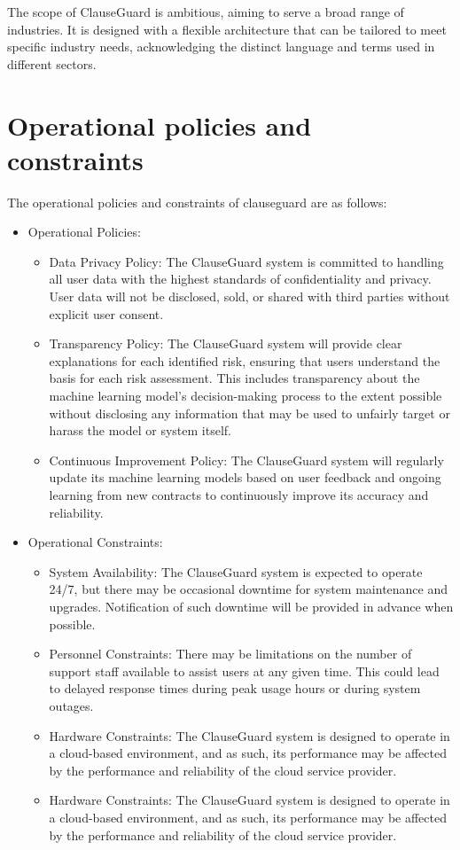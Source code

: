 The scope of ClauseGuard is ambitious, aiming to serve a broad range of industries. It is designed with a flexible architecture that can be tailored to meet specific industry needs, acknowledging the distinct language and terms used in different sectors.



\section{Operational policies and constraints \label{Section::Operational Policies and Constraints proposed}}
The operational policies and constraints of clauseguard are as follows: 
\begin{itemize}
    \item Operational Policies: 
    \begin{itemize}
        \item Data Privacy Policy: The ClauseGuard system is committed to handling all user data with the highest standards of confidentiality and privacy. User data will not be disclosed, sold, or shared with third parties without explicit user consent.

        \item Transparency Policy: The ClauseGuard system will provide clear explanations for each identified risk, ensuring that users understand the basis for each risk assessment. This includes transparency about the machine learning model's decision-making process to the extent possible without disclosing any information that may be used to unfairly target or harass the model or system itself. 
        \item Continuous Improvement Policy: The ClauseGuard system will regularly update its machine learning models based on user feedback and ongoing learning from new contracts to continuously improve its accuracy and reliability.
        
    \end{itemize}
    \item Operational Constraints: 
    \begin{itemize}
        \item System Availability: The ClauseGuard system is expected to operate 24/7, but there may be occasional downtime for system maintenance and upgrades. Notification of such downtime will be provided in advance when possible.
        \item Personnel Constraints: There may be limitations on the number of support staff available to assist users at any given time. This could lead to delayed response times during peak usage hours or during system outages.
        \item Hardware Constraints: The ClauseGuard system is designed to operate in a cloud-based environment, and as such, its performance may be affected by the performance and reliability of the cloud service provider.
        \item Hardware Constraints: The ClauseGuard system is designed to operate in a cloud-based environment, and as such, its performance may be affected by the performance and reliability of the cloud service provider.
    \end{itemize}
\end{itemize}

